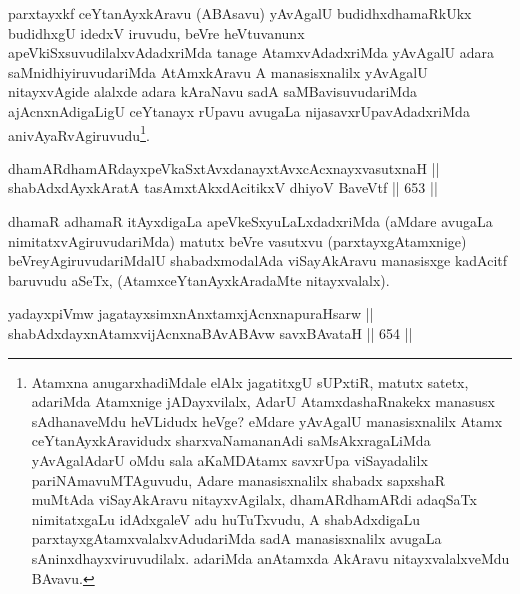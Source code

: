 \begin{artha}
parxtayxkf ceYtanAyxkAravu (ABAsavu) yAvAgalU budidhxdhamaRkUkx budidhxgU idedxV iruvudu, beVre heVtuvanunx
apeVkiSxsuvudilalxvAdadxriMda  tanage AtamxvAdadxriMda yAvAgalU adara
saMnidhiyiruvudariMda AtAmxkAravu A manasisxnalilx yAvAgalU
nitayxvAgide alalxde adara kAraNavu sadA saMBavisuvudariMda
ajAcnxnAdigaLigU ceYtanayx rUpavu avugaLa nijasavxrUpavAdadxriMda
anivAyaRvAgiruvudu\footnote{Atamxna anugarxhadiMdale elAlx jagatitxgU
sUPxtiR, matutx satetx, adariMda Atamxnige jADayxvilalx, AdarU
AtamxdashaRnakekx manasusx sAdhanaveMdu heVLidudx heVge? eMdare
yAvAgalU manasisxnalilx Atamx ceYtanAyxkAravidudx sharxvaNamananAdi
saMsAkxragaLiMda yAvAgalAdarU oMdu sala aKaMDAtamx savxrUpa
viSayadalilx pariNAmavuMTAguvudu, Adare manasisxnalilx shabadx
sapxshaR muMtAda viSayAkAravu nitayxvAgilalx, dhamARdhamARdi
adaqSaTx nimitatxgaLu idAdxgaleV adu huTuTxvudu, A shabAdxdigaLu
parxtayxgAtamxvalalxvAdudariMda sadA manasisxnalilx avugaLa
sAninxdhayxviruvudilalx. adariMda anAtamxda AkAravu nitayxvalalxveMdu
BAvavu.}.
\end{artha}


\begin{shl}
dhamARdhamARdayxpeVkaSxtAvxdanayxtAvxcAcxnayxvasutxnaH || \\
shabAdxdAyxkAratA tasAmxtAkxdAcitikxV dhiyoV BaveVtf \hfill || 653 ||  
\end{shl}

\begin{artha}
dhamaR adhamaR itAyxdigaLa apeVkeSxyuLaLxdadxriMda (aMdare avugaLa
nimitatxvAgiruvudariMda) matutx beVre vasutxvu (parxtayxgAtamxnige)
beVreyAgiruvudariMdalU shabadxmodalAda viSayAkAravu manasisxge
kadAcitf baruvudu aSeTx, (AtamxceYtanAyxkAradaMte nitayxvalalx).
\end{artha}


\begin{shl}
yadayxpiVmw jagatayxsimxnAnxtamxjAcnxnapuraHsarw || \\
shabAdxdayxnAtamxvijAcnxnaBAvABAvw savxBAvataH \hfill || 654 ||  
\end{shl}

